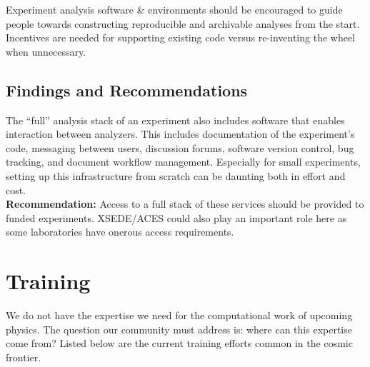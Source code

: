 Experiment analysis software \& environments should be encouraged to guide people towards constructing reproducible and archivable analyses from the start.
Incentives are needed for supporting existing code versus re-inventing the wheel when unnecessary.

\subsection{Findings and Recommendations}
The “full” analysis stack of an experiment also includes software that enables interaction between analyzers. This includes documentation of the experiment's code, messaging between users, discussion forums, software version control, bug tracking, and document workflow management. Especially for small experiments, setting up this infrastructure from scratch can be daunting both in effort and cost.\\
\textbf{Recommendation:} Access to a full stack of these services should be provided to funded experiments.  XSEDE/ACES could also play an important role here as some laboratories have onerous access requirements.

\section{Training}\label{sec:training}

We do not have the expertise we need for the computational work of upcoming physics.  The question our community must address is: where can this expertise come from?  Listed below are the current training efforts common in the cosmic frontier. 


